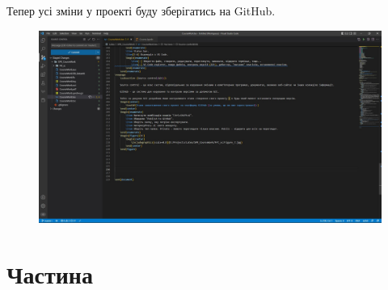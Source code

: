 \documentclass[a4paper,12pt]{article}
\begin{document}
\newpage
    Тепер усі зміни у проекті буду зберігатись на GitHub.
    \begin{figure}[h!]
        \begin{center}
            \includegraphics[scale=0.35]{Prt sc/Figure_8.jpg}
        \end{center}
    \end{figure}





\newpage
    \section{Частина}
\end{document}
